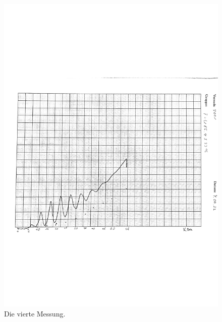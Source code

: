 \begin{figure}
    \centering
    \includegraphics[width=\linewidth]{pictures/kurve4.pdf}
    \caption{Die vierte Messung.}
    \label{fig:kurve4}
\end{figure}